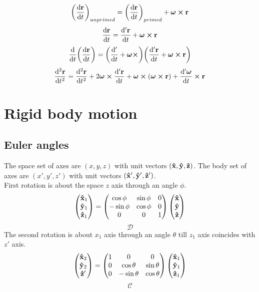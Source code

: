 \documentclass[12pt]{article}
\begin{document}
\[\qty(\dv{\vb{r}}{t})_{un primed}=\qty(\dv{\vb{r}}{t})_{primed}+\bm{\omega}\cp\vb{r}\]
\[\dv{\vb{r}}{t}=\dv{'\vb{r}}{t}+\bm{\omega}\cp\vb{r}\]
\[\dv{t}\qty(\dv{\vb{r}}{t})=\qty(\dv{'}{t}+\bm{\omega}\cp)\qty(\dv{'\vb{r}}{t}+\bm{\omega}\cp\vb{r})\]
\[\dv[2]{\vb{r}}{t}=\dv[2]{\vb{r}}{t}+2\bm{\omega}\cp\dv{'\vb{r}}{t}+\bm{\omega}\cp(\bm{\omega}\cp\vb{r})+\dv{'\bm{\omega}}{t}\cp\vb{r}\]

\section*{Rigid body motion}
\subsection*{Euler angles}
The space set of axes are $(x,y,z)$ with unit vectors $(\vu{x},\vu{y},\vu{z})$. The body set of axes are $(x',y',z')$ with unit vectors $(\vu{x}',\vu{y}',\vu{z}')$.\\
First rotation is about the space $z$ axis through an angle $\phi$.
\[
\begin{pmatrix}
\vu{x}_1\\ \vu{y}_1\\ \vu{z}_1
\end{pmatrix}
=
\begin{pmatrix}
\cos\phi& \sin\phi& 0\\
-\sin\phi& \cos\phi& 0\\
0& 0& 1
\end{pmatrix}
\begin{pmatrix}
\vu{x}\\ \vu{y}\\ \vu{z}
\end{pmatrix}
\]
\[\mathcal{D}\]
The second rotation is about $x_1$ axis through an angle $\theta$ till $z_1$ axis coincides with $z'$ axis.
\[
\begin{pmatrix}
\vu{x}_2\\ \vu{y}_2\\ \vu{z}'
\end{pmatrix}
=
\begin{pmatrix}
1& 0& 0 \\
0& \cos\theta& \sin\theta\\
0& -\sin\theta& \cos\theta
\end{pmatrix}
\begin{pmatrix}
\vu{x}_1\\ \vu{y}_1\\ \vu{z}_1
\end{pmatrix}
\]
\[\mathcal{C}\]
\end{document}
